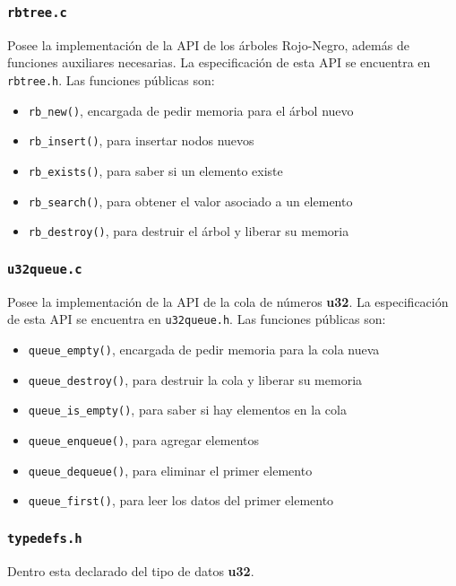 \documentclass[11pt]{article}   	%
\begin{document}
\subsubsection{\texttt{rbtree.c}}
Posee la implementación de la API de los árboles Rojo-Negro, además de funciones auxiliares necesarias.
La especificación de esta API se encuentra en \texttt{rbtree.h}.
Las funciones públicas son:

\begin{itemize}
\item \texttt{rb\_new()}, encargada de pedir memoria para el árbol nuevo
\item \texttt{rb\_insert()}, para insertar nodos nuevos
\item \texttt{rb\_exists()}, para saber si un elemento existe
\item \texttt{rb\_search()}, para obtener el valor asociado a un elemento
\item \texttt{rb\_destroy()}, para destruir el árbol y liberar su memoria
\end{itemize}

\subsubsection{\texttt{u32queue.c}}
Posee la implementación de la API de la cola de números \textbf{u32}.
La especificación de esta API se encuentra en \texttt{u32queue.h}.
Las funciones públicas son:

\begin{itemize}
\item \texttt{queue\_empty()}, encargada de pedir memoria para la cola nueva 
\item \texttt{queue\_destroy()}, para destruir la cola y liberar su memoria
\item \texttt{queue\_is\_empty()}, para saber si hay elementos en la cola
\item \texttt{queue\_enqueue()}, para agregar elementos
\item \texttt{queue\_dequeue()}, para eliminar el primer elemento
\item \texttt{queue\_first()}, para leer los datos del primer elemento
\end{itemize}

\subsubsection{\texttt{typedefs.h}}
Dentro esta declarado del tipo de datos \textbf{u32}.
\end{document}
